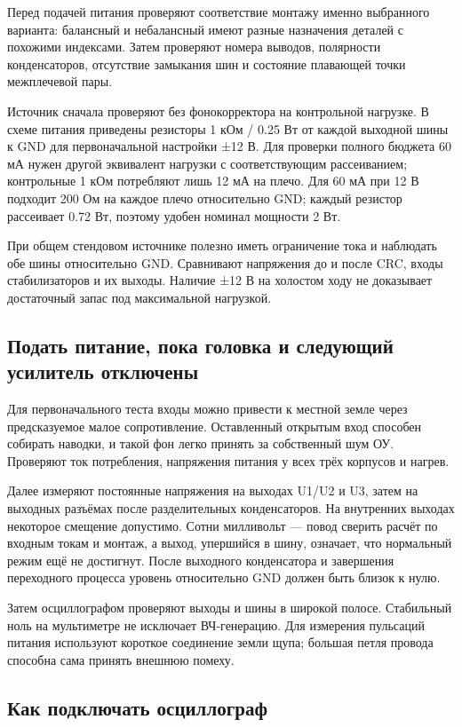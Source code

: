 \documentclass[a4paper,11pt]{article}
\begin{document}
Перед подачей питания проверяют соответствие монтажу именно выбранного варианта:
балансный и небалансный имеют разные назначения деталей с похожими индексами.
Затем проверяют номера выводов, полярности конденсаторов, отсутствие замыкания
шин и состояние плавающей точки межплечевой пары.

Источник сначала проверяют без фонокорректора на контрольной нагрузке.
В схеме питания приведены резисторы 1 кОм / 0.25 Вт от каждой выходной шины
к GND для первоначальной настройки ±12 В. Для проверки полного бюджета
60 мА нужен другой эквивалент нагрузки с соответствующим рассеиванием;
контрольные 1 кОм потребляют лишь 12 мА на плечо.
Для 60 мА при 12 В подходит 200 Ом на каждое плечо относительно GND;
каждый резистор рассеивает 0.72 Вт, поэтому удобен номинал мощности 2 Вт.

При общем стендовом источнике полезно иметь ограничение тока и наблюдать
обе шины относительно GND. Сравнивают напряжения до и после CRC, входы
стабилизаторов и их выходы. Наличие ±12 В на холостом ходу не доказывает
достаточный запас под максимальной нагрузкой.

\subsection{Подать питание, пока головка и следующий усилитель отключены}

Для первоначального теста входы можно привести к местной земле через
предсказуемое малое сопротивление. Оставленный открытым вход способен собирать
наводки, и такой фон легко принять за собственный шум ОУ.
Проверяют ток потребления, напряжения питания у всех трёх корпусов и нагрев.

Далее измеряют постоянные напряжения на выходах U1/U2 и U3, затем на выходных
разъёмах после разделительных конденсаторов. На внутренних выходах некоторое
смещение допустимо. Сотни милливольт — повод сверить расчёт по входным токам
и монтаж, а выход, упершийся в шину, означает, что нормальный режим ещё не достигнут.
После выходного конденсатора и завершения переходного процесса уровень
относительно GND должен быть близок к нулю.

Затем осциллографом проверяют выходы и шины в широкой полосе.
Стабильный ноль на мультиметре не исключает ВЧ-генерацию.
Для измерения пульсаций питания используют короткое соединение земли щупа;
большая петля провода способна сама принять внешнюю помеху.

\subsection{Как подключать осциллограф}
\end{document}
